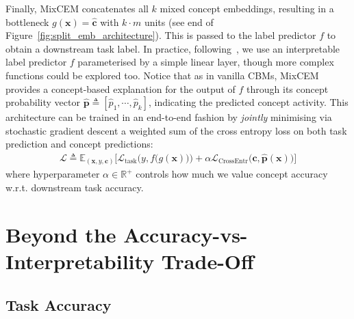 \documentclass[withindex,glossary]{cam-thesis}
\theoremstyle{plain}
\theoremstyle{definition}
\theoremstyle{remark}
\begin{document}
Finally, MixCEM concatenates all $k$ mixed concept embeddings, resulting in a bottleneck $g(\mathbf{x}) = \hat{\textbf{c}}$ with $k\cdot m$ units (see end of Figure~\ref{fig:split_emb_architecture}). This is passed to the label predictor $f$ to obtain a downstream task label. In practice, following~\citet{koh2020concept}, we use an interpretable label predictor $f$ parameterised by a simple linear layer, though more complex functions could be explored too. Notice that as in vanilla CBMs, MixCEM provides a concept-based explanation for the output of $f$ through its concept probability vector $\hat{\mathbf{p}} \triangleq [\hat{p}_1, \cdots, \hat{p}_k ]$, indicating the predicted concept activity. This architecture can be trained in an end-to-end fashion by \textit{jointly} minimising via stochastic gradient descent a weighted sum of the cross entropy loss on both task prediction and concept predictions:
\begin{align}
    \mathcal{L} \triangleq \mathbb{E}_{(\mathbf{x}, y, \mathbf{c})}\Big[ \mathcal{L}_\text{task}\Big(y, f\big(g(\mathbf{x})\big)\Big) + \alpha \mathcal{L}_\text{CrossEntr}\Big(\mathbf{c}, \hat{\mathbf{p}}(\mathbf{x})\Big) \Big]
\end{align}
where hyperparameter $\alpha \in \mathbb{R}^+$ controls how much we value concept accuracy w.r.t. downstream task accuracy. 


\section{Beyond the Accuracy-vs-Interpretability Trade-Off}
\subsection{Task Accuracy}
\end{document}
